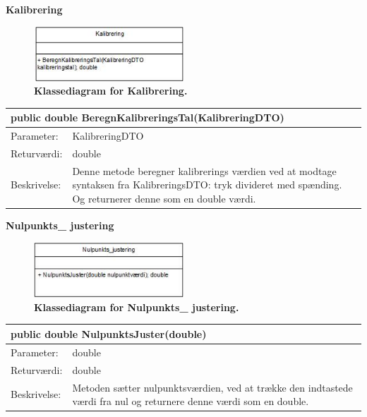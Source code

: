 \textbf{Kalibrering}
\begin{figure}[H]
\includegraphics[width =0.5\textwidth , center]{billeder/klassediagramkalibrering}
\caption{\textbf{Klassediagram for Kalibrering.}}
\end{figure}
\begin{table}[H]
\label{tab:tabel2}
\begin{tabular}{| l | p{13cm} |}
   \hline
   \multicolumn{2}{|l|}{public double BeregnKalibreringsTal(KalibreringDTO)} \\ \hline
   Parameter: & KalibreringDTO\\ \hline
   Returværdi: & double \\ \hline
   Beskrivelse: & Denne metode beregner kalibrerings værdien ved at modtage syntaksen fra KalibreringsDTO: tryk divideret med spænding. Og returnerer denne som en double værdi.\\ \hline
\end{tabular}
\end{table}

\textbf{Nulpunkts\_ justering}
\begin{figure}[H]
\includegraphics[width =0.5\textwidth , center]{billeder/klassediagramnulpunkt}
\caption{\textbf{Klassediagram for Nulpunkts\_ justering.}}
\end{figure}
\begin{table}[H]
\label{tab:tabel2}
\begin{tabular}{| l | p{13cm} |}
   \hline
   \multicolumn{2}{|l|}{public double NulpunktsJuster(double)} \\ \hline
   Parameter: & double\\ \hline
   Returværdi: & double \\ \hline
   Beskrivelse: & Metoden sætter nulpunktsværdien, ved at trække den indtastede værdi fra nul og returnere denne værdi som en double.\\ \hline
\end{tabular}
\end{table}

